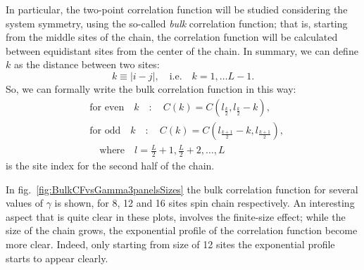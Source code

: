 In particular, the two-point correlation function will be studied considering the system symmetry, using the so-called \emph{bulk} correlation function; that is, starting from the middle sites of the chain, the correlation function will be calculated between equidistant sites from the center of the chain. In summary, we can define $k$ as the distance between two sites:
\begin{equation*}
    k \equiv |i-j|, \quad \text{i.e.} \quad k = 1, \dots L-1.
\end{equation*}
So, we can formally write the bulk correlation function in this way:
\begin{equation*}
\begin{split}
    &\text{for even} \quad k \quad : \quad C(k) = C(l_{\frac{k}{2}}, l_{\frac{k}{2}}-k),\\
    &\text{for odd} \quad k \quad : \quad C(k) = C(l_{\frac{k+1}{2}}-k, l_{\frac{k+1}{2}}),\\
    & \quad \text{where} \quad l = \frac{L}{2}+1, \frac{L}{2}+2, \dots, L
\end{split}
\end{equation*}
is the site index for the second half of the chain.

In fig.~\ref{fig:BulkCFvsGamma3panelsSizes} the bulk correlation function for several values of $\gamma$ is shown, for 8, 12 and 16 sites spin chain respectively.  An interesting aspect that is quite clear in these plots, involves the finite-size effect; while the size of the chain grows, the exponential profile of the correlation function become more clear. Indeed, only starting from size of 12 sites the exponential profile starts to appear clearly.

